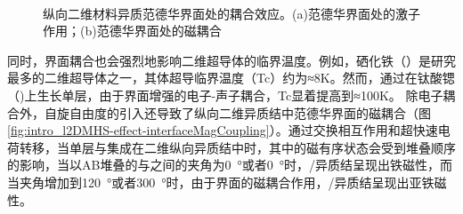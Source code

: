     \begin{figure}[htb]
        \\
        \caption{纵向二维材料异质范德华界面处的耦合效应。(a)范德华界面处的激子作用；(b)范德华界面处的磁耦合}
        \label{fig:intro_l2DMHS-effect}
    \end{figure}

    同时，界面耦合也会强烈地影响二维超导体的临界温度。例如，硒化铁（）是研究最多的二维超导体之一，其体超导临界温度（Tc）约为≈8K。然而，通过在钛酸锶（)上生长单层，由于界面增强的电子-声子耦合，Tc显着提高到≈100K。
    除电子耦合外，自旋自由度的引入还导致了纵向二维异质结中范德华界面的磁耦合（图\ref{fig:intro_l2DMHS-effect-interfaceMagCoupling}）。通过交换相互作用和超快速电荷转移，当单层与集成在二维纵向异质结中时，其中的磁有序状态会受到堆叠顺序的影响，当以AB堆叠的与之间的夹角为\SI{0}{\degree}或者\SI{0}{\degree}时，/异质结呈现出铁磁性，而当夹角增加到\SI{120}{\degree}或者\SI{300}{\degree}时，由于界面的磁耦合作用，/异质结呈现出亚铁磁性。

